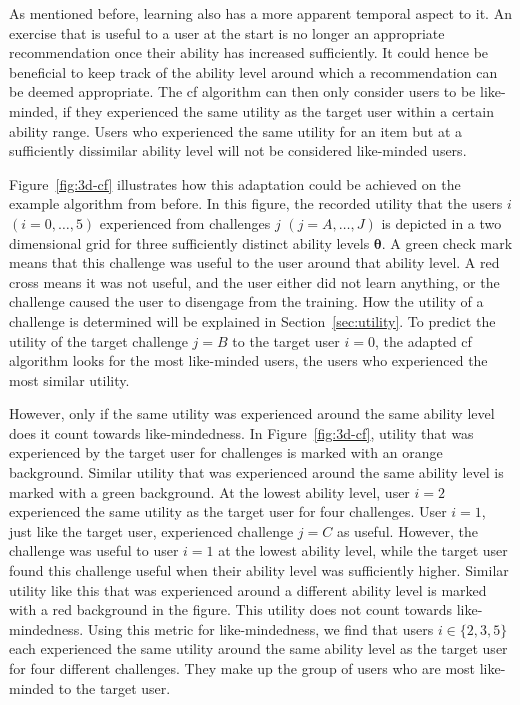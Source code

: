 As mentioned before, learning also has a more apparent temporal aspect to it.
An exercise that is useful to a user at the start is no longer an appropriate recommendation once their ability has increased sufficiently.
It could hence be beneficial to keep track of the ability level around which a recommendation can be deemed appropriate.
The \gls{cf} algorithm can then only consider users to be like-minded, if they experienced the same utility as the target user within a certain ability range.
Users who experienced the same utility for an item but at a sufficiently dissimilar ability level will not be considered like-minded users.

Figure~\ref{fig:3d-cf} illustrates how this adaptation could be achieved on the example algorithm from before.
In this figure, the recorded utility that the users $i$ $(i = 0,\dots,5)$ experienced from challenges $j$ $(j = A,\dots,J)$ is depicted in a two dimensional grid for three sufficiently distinct ability levels $\bm\theta$.
A green check mark means that this challenge was useful to the user around that ability level.
A red cross means it was not useful, and the user either did not learn anything, or the challenge caused the user to disengage from the training.
How the utility of a challenge is determined will be explained in Section~\ref{sec:utility}.
To predict the utility of the target challenge $j = B$ to the target user $i = 0$, the adapted \gls{cf} algorithm looks for the most like-minded users, the users who experienced the most similar utility.

However, only if the same utility was experienced around the same ability level does it count towards like-mindedness.
In Figure~\ref{fig:3d-cf}, utility that was experienced by the target user for challenges is marked with an orange background.
Similar utility that was experienced around the same ability level is marked with a green background.
At the lowest ability level, user $i = 2$ experienced the same utility as the target user for four challenges.
User $i = 1$, just like the target user, experienced challenge $j = C$ as useful.
However, the challenge was useful to user $i = 1$ at the lowest ability level, while the target user found this challenge useful when their ability level was sufficiently higher.
Similar utility like this that was experienced around a different ability level is marked with a red background in the figure.
This utility does not count towards like-mindedness.
Using this metric for like-mindedness, we find that users $i \in \{2,3,5\}$ each experienced the same utility around the same ability level as the target user for four different challenges.
They make up the group of users who are most like-minded to the target user.


